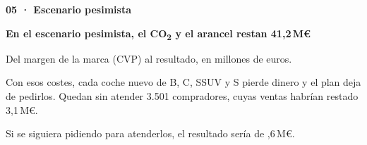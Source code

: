 \documentclass[aspectratio=169,10pt]{beamer}
\newcommand{\ME}{\,M€}
\newcommand{\co}{CO\textsubscript{2}}
\newcommand{\serif}{\bfseries}
\newcommand{\cab}[3]{%
  \vspace*{0mm}\hyphenpenalty=10000 \exhyphenpenalty=10000 \raggedright
  {\footnotesize\bfseries\color{sec}#1}\par\vspace{2mm}
  {\serif\fontsize{17}{20}\selectfont\color{tinta}#2\par}\vspace{1.5mm}
  {\small\color{sec}#3\par}\vspace{4mm}}
\def\w{11}
\newcommand{\wf}[6]{\fill[#4] ({#1*15},#2) rectangle ({#1*15+\w},#3);
  \node[font=\fontsize{7.5}{8}\selectfont,above] at ({#1*15+\w/2},#3) {#5};
  \node[font=\fontsize{7}{8}\selectfont,text=sec,below] at ({#1*15+\w/2},0) {#6};}
\begin{document}
\begin{frame}[t]
\cab{05 · Escenario pesimista}{En el escenario pesimista, el \co{} y el arancel restan 41,2\ME}{Del margen de la marca (CVP) al resultado, en millones de euros.}
\begin{minipage}[t]{.5\linewidth}\vspace{0pt}
\end{minipage}\hfill
\begin{minipage}[t]{.42\linewidth}\vspace{2mm}
\begin{idea}
{\footnotesize Con esos costes, cada coche nuevo de B, C, SSUV y S pierde dinero y el plan deja de pedirlos. Quedan sin atender 3.501 compradores, cuyas ventas habrían restado 3,1\ME.}\par\vspace{2mm}
{\footnotesize Si se siguiera pidiendo para atenderlos, el resultado sería de {\color{pes},6\ME}.}
\end{idea}
\end{minipage}
\end{frame}
\end{document}
